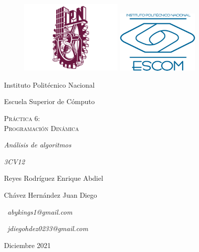 \documentclass{article}
\begin{document}
\begin{titlepage}
        \begin{figure}
            \vspace{-8 em}
            \hspace{-10 em}
            \includegraphics[width=5cm]{ipn} \hfill \includegraphics[width=4cm]{escom}
            \hspace{-8 em}
        \end{figure}
        \begin{center}
            {\large Instituto Politécnico Nacional \par}
            {\Large Escuela Superior de Cómputo \par}
            \vspace{3cm}
            {\scshape\Huge Práctica 6: \\Programación Dinámica\\ \bfseries  \par}
            \vspace{3cm}
            {\itshape\Large Análisis de algoritmos \par}
            {\itshape\Large 3CV12 \par}
            \vfill
            {\Large Reyes Rodríguez Enrique Abdiel \par}
            {\Large Chávez Hernández Juan Diego \par}
            \vfill
            {\ \textit{abykings1@gmail.com} \par}
            {\ \textit{jdiegohdez0233@gmail.com} \par}
            \vfill
            {\Large Diciembre 2021\par}
        \end{center}
    \end{titlepage}
\newpage
\end{document}
